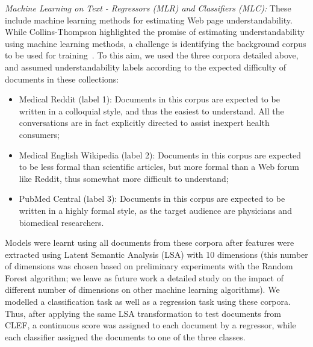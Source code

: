 

\textit{Machine Learning on Text - Regressors (MLR) and Classifiers (MLC):} These include machine learning methods for estimating Web page understandability. While Collins-Thompson highlighted the promise of estimating understandability using machine learning methods, a challenge is identifying the background corpus to be used for training~\cite{collins2014computational}. To this aim, we used the three corpora detailed above, and assumed understandability labels according to the expected difficulty of documents in these collections:

\begin{itemize}[leftmargin=*]
    \item Medical Reddit (label 1): Documents in this corpus are expected to be written in a colloquial style, and thus the easiest to understand. All the conversations are in fact explicitly directed to assist inexpert health consumers;
    \item Medical English Wikipedia (label 2): Documents in this corpus are expected to be less formal than scientific articles, but more formal than a Web forum like Reddit, thus somewhat more difficult to understand;
    \item PubMed Central (label 3): Documents in this corpus are expected to be written in a highly formal style, as the target audience are physicians and biomedical researchers.
\end{itemize}

Models were learnt using all documents from these corpora after features were extracted using Latent Semantic Analysis (LSA) with 10 dimensions (this number of dimensions was chosen based on preliminary experiments with the Random Forest algorithm; we leave as future work a detailed study on the impact of different number of dimensions on other machine learning algorithms). We modelled a classification task as well as a regression task using these corpora. Thus, after applying the same LSA transformation to test documents from CLEF, a continuous score was assigned to each document by a regressor, while each classifier assigned the documents to one of the three classes. %





